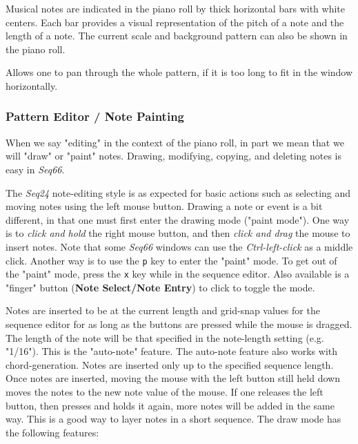    Musical notes are indicated in the piano roll
   by thick horizontal bars with white
   centers.  Each bar provides
   a visual representation of the pitch of a note and the length of a note.
   The current scale and background pattern can also be shown in the piano
   roll.

   Allows one to pan through the whole pattern, if it is too long to fit in
   the window horizontally.

\subsubsection{Pattern Editor / Note Painting}
\label{subsubsec:pattern_editor_note_painting}

   When we say "editing" in the context of the piano roll, in part we mean that
   we will "draw"
   or "paint" notes.
   Drawing, modifying, copying, and deleting notes is easy in \textsl{Seq66}.

   The \textsl{Seq24} note-editing style is as expected for basic
   actions such as selecting and moving notes using the left mouse button.
   Drawing a note or event is a bit different, in that one must first
   enter the drawing mode ("paint mode").
   One way is to \textsl{click and hold} the right mouse button, and then
   \textsl{click and drag} the mouse to insert notes.
   Note that some \textsl{Seq66} windows
   can use the \textsl{Ctrl-left-click} as a middle click. 
   Another way is to use the \texttt{p} key to enter the "paint" mode.
   To get out of the "paint" mode, press the
   \texttt{x} key while in the sequence editor.
   Also available is a "finger" button
   (\textbf{Note Select/Note Entry})
   to click to toggle the mode.

   Notes are inserted to be at the current length and grid-snap values for
   the sequence editor for as long as the buttons are pressed while the mouse
   is dragged.
   The length of the note will
   be that specified in the note-length setting (e.g. "1/16").
   This is the "auto-note" feature.
   The auto-note feature also works with chord-generation.
   Notes are inserted only up to the specified sequence length.
   Once notes are inserted, moving the mouse with the left button still
   held down moves the notes to the new note value of the mouse.
   If one releases the left button, then presses and holds it again,
   more notes will be added in the same way.
   This is a good way to layer notes in a short sequence.
   The draw mode has the following features:


